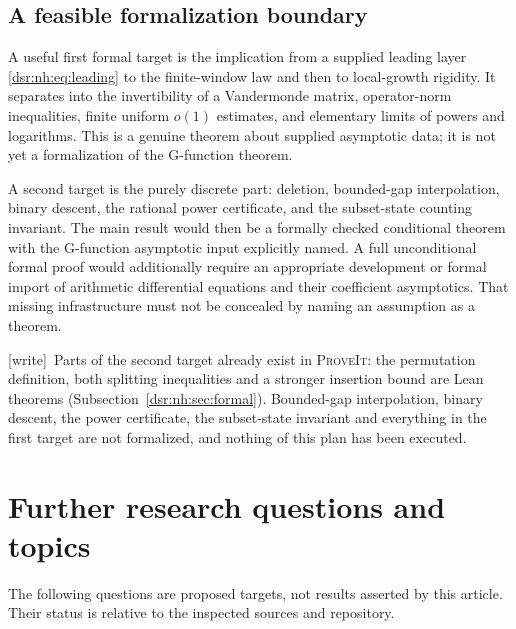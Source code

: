 \documentclass[11pt,a4paper]{article}
\numberwithin{equation}{section}
\theoremstyle{definition}
\theoremstyle{remark}
\newcommand{\repo}{\textsc{ProveIt}}
\newcommand{\wtag}{\textup{[write]}}
\theoremstyle{definition}
\theoremstyle{plain}
\begin{document}
\subsection{A feasible formalization boundary}
A useful first formal target is the implication from a supplied leading
layer \eqref{dsr:nh:eq:leading} to the finite-window law and then to local-growth
rigidity. It separates into the invertibility of a Vandermonde matrix,
operator-norm inequalities, finite uniform $o(1)$ estimates, and elementary
limits of powers and logarithms. This is a genuine theorem about supplied
asymptotic data; it is not yet a formalization of the G-function theorem.

A second target is the purely discrete part: deletion, bounded-gap
interpolation, binary descent, the rational power certificate, and the
subset-state counting invariant. The main result would then be a formally
checked conditional theorem with the G-function asymptotic input explicitly
named. A full unconditional formal proof would additionally require an
appropriate development or formal import of arithmetic differential
equations and their coefficient asymptotics. That missing infrastructure
must not be concealed by naming an assumption as a theorem.

\wtag\ Parts of the second target already exist in \repo: the permutation
definition, both splitting inequalities and a stronger insertion bound
are Lean theorems (Subsection~\ref{dsr:nh:sec:formal}). Bounded-gap
interpolation, binary descent, the power certificate, the subset-state
invariant and
everything in the first target are not formalized, and nothing of this
plan has been executed.

\section{Further research questions and topics}
\label{dsr:nh:sec:future}
The following questions are proposed targets, not results asserted by this
article. Their status is relative to the inspected sources and repository.
\end{document}
